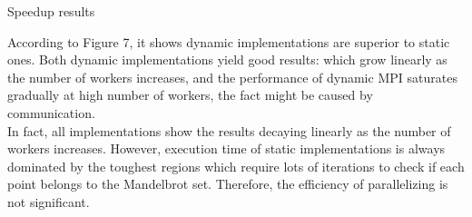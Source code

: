 \documentclass[12pt]{article}
\makeatletter
\renewenvironment{itemize}
{\list{$\bullet$}{\leftmargin\z@ \labelwidth\z@ \itemindent-\leftmargin
\let\makelabel\descriptionlabel}}
{\endlist}
\makeatother
\begin{document}
\begin{itemize}
    \item Speedup results
    \begin{flushleft}
        According to Figure 7, it shows dynamic implementations are superior to static ones. Both dynamic implementations yield good results: which grow linearly as the number of workers increases, and the performance of dynamic MPI saturates gradually at high number of workers, the fact might be caused by communication. \\
        In fact, all implementations show the results decaying linearly as the number of workers increases. However, execution time of static implementations is always dominated by the toughest regions which require lots of iterations to check if each point belongs to the Mandelbrot set. Therefore, the efficiency of parallelizing is not significant.
    \end{flushleft}

    \newpage


\end{itemize}
\end{document}

